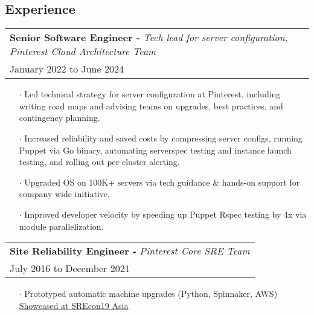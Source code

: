 \documentclass[letterpaper, oneside, final]{scrartcl} %
\begin{document}
\begin{center}
\section{Experience}

\renewcommand{\arraystretch}{1.3}
\begingroup\setlength{\fboxsep}{0pt}
\colorbox{mygray}{
\begin{flushleft}
\begin{tabularx}{\textwidth}{l}
\textbf{Senior Software Engineer -} \textit{Tech lead for server configuration, Pinterest Cloud Architecture Team}\\
January 2022 to June 2024\\
\end{tabularx}
\end{flushleft}
}\endgroup
\vspace{-0.1cm}
\begin{itemize} \itemsep-0.2cm


\item[$\cdot$] Led technical strategy for server configuration at Pinterest, including writing road maps and advising teams on upgrades, best practices, and contingency planning.\\[10pt]
\item[$\cdot$] Increased reliability and saved costs by compressing server configs, running Puppet via Go binary, automating serverspec testing and instance launch testing, and rolling out per-cluster alerting.\\[10pt]
\item[$\cdot$] Upgraded OS on 100K+ servers via tech guidance \& hands-on support for company-wide initiative.\\[10pt]
\item[$\cdot$] Improved developer velocity by speeding up Puppet Rspec testing by 4x via module parallelization.\\[10pt]


\end{itemize}


\begingroup\setlength{\fboxsep}{0pt}
\colorbox{mygray}{
\begin{flushleft}
\begin{tabularx}{\textwidth}{l}
\textbf{Site Reliability Engineer -} \textit{Pinterest Core SRE Team}\\
July 2016 to December 2021\\
\end{tabularx}
\end{flushleft}
}\endgroup
\vspace{-0.1cm}
\begin{itemize} \itemsep-0.2cm
\item[$\cdot$] Prototyped automatic machine upgrades (Python, Spinnaker, AWS) \underline{\href{https://www.usenix.org/conference/srecon19asia/presentation/menezes}{Showcased at SREcon19 Asia}}\\[10pt]


\end{itemize}
\end{center}
\end{document}
